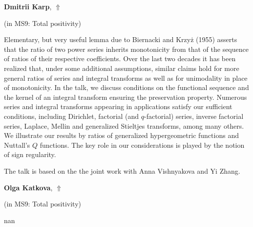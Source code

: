 \documentclass[ILAS2025-program.tex]{subfiles}
\begin{document}
\hypertarget{down0044}{}\begin{ilasabstract}
    
\textbf{Dmitrii Karp},  \hfill \hyperlink{up0044}{$\Uparrow$}
    
    
(in {\color{mstitle}MS9: Total positivity})
        
\mtskip
    Elementary, but very useful lemma due to Biernacki and Krzy\.{z} (1955) asserts that the ratio of two power series inherits monotonicity from that of the sequence of ratios of their respective  coefficients. Over the last two decades it has been realized that, under some additional assumptions, similar claims hold for more general ratios of series and integral
transforms as well as for unimodality in place of monotonicity. In the talk, we discuss conditions on the functional sequence and the kernel of an integral transform ensuring the preservation property. Numerous series and integral transforms appearing in applications satisfy our sufficient conditions, including Dirichlet, factorial (and $q$-factorial) series, inverse factorial series, Laplace, Mellin and generalized Stieltjes transforms, among many others.  We illustrate our results by ratios of generalized hypergeometric functions and Nuttall's $Q$ functions.  The key role in our considerations is played by the notion of sign regularity.

The talk is based on the the joint work with Anna Vishnyakova and Yi Zhang. 

\end{ilasabstract}
    

\hypertarget{down0120}{}\begin{ilasabstract}
    
\textbf{Olga Katkova},  \hfill \hyperlink{up0120}{$\Uparrow$}
    
    
(in {\color{mstitle}MS9: Total positivity})
        
\mtskip
    nan
\end{ilasabstract}
    
\end{document}
